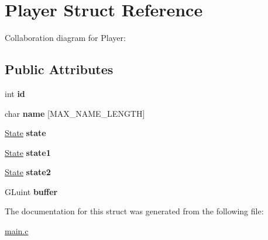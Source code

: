 \hypertarget{structPlayer}{}\section{Player Struct Reference}
\label{structPlayer}


Collaboration diagram for Player\+:
\subsection*{Public Attributes}
\begin{DoxyCompactItemize}
\item 
\mbox{\label{structPlayer_a05e05f3a23de78da7ec032ec2bcf8c6c}} 
int {\bfseries id}
\item 
\mbox{\label{structPlayer_a000f74f4241ebc344866c82bec4ed5ef}} 
char {\bfseries name} \mbox{[}M\+A\+X\+\_\+\+N\+A\+M\+E\+\_\+\+L\+E\+N\+G\+TH\mbox{]}
\item 
\mbox{\label{structPlayer_ac4a623bf6650a719187c50bb0413b9a0}} 
\hyperlink{structState}{State} {\bfseries state}
\item 
\mbox{\label{structPlayer_a7712ad6df23e875de18fb38537620909}} 
\hyperlink{structState}{State} {\bfseries state1}
\item 
\mbox{\label{structPlayer_a7b894c51bb7a740af4a2ffef56a4e788}} 
\hyperlink{structState}{State} {\bfseries state2}
\item 
\mbox{\label{structPlayer_a6be397c2a7cb79256e85dc6a96055f45}} 
G\+Luint {\bfseries buffer}
\end{DoxyCompactItemize}


The documentation for this struct was generated from the following file\+:\begin{DoxyCompactItemize}
\item 
\hyperlink{main_8c}{main.\+c}\end{DoxyCompactItemize}
